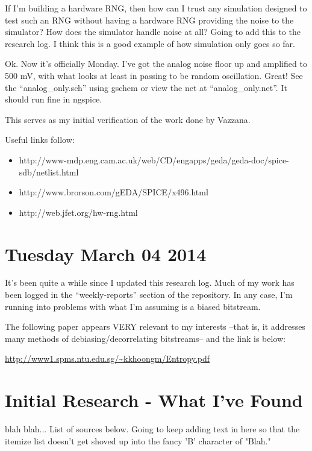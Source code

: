 \documentclass[journal]{IEEEtran}
\begin{document}
If I'm building a hardware RNG, then how can I trust any simulation designed
to test such an RNG without having a hardware RNG providing the noise to
the simulator? How does the simulator handle noise at all? Going to add
this to the research log. I think this is a good example of how simulation
only goes so far.

Ok. Now it's officially Monday. I've got the analog noise floor up and 
amplified to 500 mV, with what looks at least in passing to be random 
oscillation. Great! See the ``analog\_only.sch'' using gschem or view the 
net at ``analog\_only.net''. It should run fine in ngspice. 

This serves as my initial verification of the work done by Vazzana.

Useful links follow:

\begin{itemize}
\item
http://www-mdp.eng.cam.ac.uk/web/CD/engapps/geda/geda-doc/spice-sdb/netlist.html
\item
http://www.brorson.com/gEDA/SPICE/x496.html
\item
http://web.jfet.org/hw-rng.html
\end{itemize}

\section{Tuesday March 04 2014}

It's been quite a while since I updated this research log. Much of my work 
has been logged in the ``weekly-reports'' section of the repository. In any 
case, I'm running into problems with what I'm assuming is a biased bitstream.

The following paper appears VERY relevant to my interests --that is, it 
addresses many methods of debiasing/decorrelating bitstreams-- and the 
link is below:

\url{http://www1.spms.ntu.edu.sg/~kkhoongm/Entropy.pdf}

\section{Initial Research - What I've Found}

 blah blah... List of sources below. Going to keep 
adding text in here so that the itemize list doesn't get shoved up into 
the fancy 'B' character of "Blah."
\end{document}
